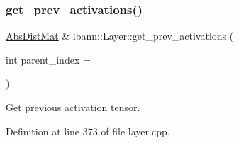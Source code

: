 \subsubsection{\texorpdfstring{get\+\_\+prev\+\_\+activations()}{get\_prev\_activations()}\hspace{0.1cm}{\footnotesize\ttfamily [1/2]}}
{\footnotesize\ttfamily \hyperlink{base_8hpp_a9a697a504ae84010e7439ffec862b470}{Abs\+Dist\+Mat} \& lbann\+::\+Layer\+::get\+\_\+prev\+\_\+activations (\begin{DoxyParamCaption}\item[{int}]{parent\+\_\+index = {} }\end{DoxyParamCaption})}

Get previous activation tensor. 

Definition at line 373 of file layer.\+cpp.


